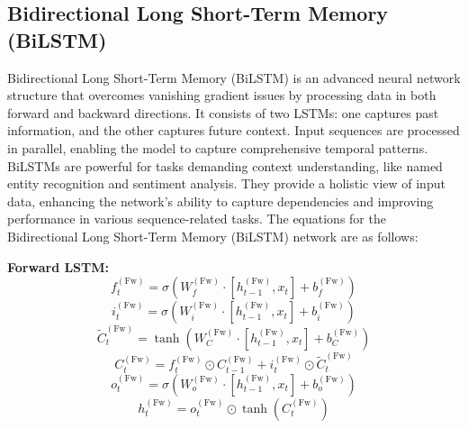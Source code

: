 \documentclass[sn-mathphys,Numbered]{sn-jnl}
\theoremstyle{thmstyleone}
\theoremstyle{thmstyletwo}
\theoremstyle{thmstylethree}
\begin{document}
\subsection{Bidirectional Long Short-Term Memory (BiLSTM)}
Bidirectional Long Short-Term Memory (BiLSTM) is an advanced neural network structure that overcomes vanishing gradient issues by processing data in both forward and backward directions. It consists of two LSTMs: one captures past information, and the other captures future context. Input sequences are processed in parallel, enabling the model to capture comprehensive temporal patterns. BiLSTMs are powerful for tasks demanding context understanding, like named entity recognition and sentiment analysis. They provide a holistic view of input data, enhancing the network's ability to capture dependencies and improving performance in various sequence-related tasks.
The equations for the Bidirectional Long Short-Term Memory (BiLSTM) network are as follows:

\textbf{Forward LSTM:}
\begin{equation}
f_t^{(\text{Fw})} = \sigma(W_{f}^{(\text{Fw})} \cdot [h_{t-1}^{(\text{Fw})}, x_t] + b_{f}^{(\text{Fw})})
\end{equation}
\begin{equation}
i_t^{(\text{Fw})} = \sigma(W_{i}^{(\text{Fw})} \cdot [h_{t-1}^{(\text{Fw})}, x_t] + b_{i}^{(\text{Fw})})
\end{equation}
\begin{equation}
\tilde{C}_t^{(\text{Fw})} = \tanh(W_{C}^{(\text{Fw})} \cdot [h_{t-1}^{(\text{Fw})}, x_t] + b_{C}^{(\text{Fw})})
\end{equation}
\begin{equation}
C_t^{(\text{Fw})} = f_t^{(\text{Fw})} \odot C_{t-1}^{(\text{Fw})} + i_t^{(\text{Fw})} \odot \tilde{C}_t^{(\text{Fw})}
\end{equation}
\begin{equation}
o_t^{(\text{Fw})} = \sigma(W_{o}^{(\text{Fw})} \cdot [h_{t-1}^{(\text{Fw})}, x_t] + b_{o}^{(\text{Fw})})
\end{equation}
\begin{equation}
h_t^{(\text{Fw})} = o_t^{(\text{Fw})} \odot \tanh(C_t^{(\text{Fw})})
\end{equation}
\end{document}
